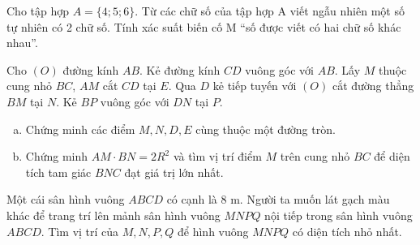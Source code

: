 \begin{ex} %
	Cho tập hợp $A=\{4;5;6\}$. Từ các chữ số của tập hợp A viết ngẫu nhiên một số tự nhiên có 2 chữ số. Tính xác suất biến cố M “số được viết có hai chữ số khác nhau”.
\end{ex}
\begin{ex} %
	Cho $(O)$ đường kính $AB$. Kẻ đường kính $CD$ vuông góc với $AB$. Lấy $M$ thuộc cung nhỏ $BC$, $AM$ cắt $CD$ tại $E$. Qua $D$ kẻ tiếp tuyến với $(O)$ cắt đường thẳng $BM$ tại $N$. Kẻ $BP$ vuông góc với $DN$ tại $P$.
	\begin{enumerate}[a)]
		\item Chứng minh các điểm $M, N, D, E$ cùng thuộc một đường tròn.
		\item Chứng minh $AM \cdot BN = 2R^2$ và tìm vị trí điểm $M$ trên cung nhỏ $BC$ để diện tích tam giác $BNC$ đạt giá trị lớn nhất.
	\end{enumerate}
	\loigiai{}
\end{ex}

\begin{ex} Một cái sân hình vuông $ABCD$ có cạnh là $8 \text{ m}$. Người ta muốn lát gạch màu khác để trang trí lên mảnh sân hình vuông $MNPQ$ nội tiếp trong sân hình vuông $ABCD$. Tìm vị trí của $M, N, P, Q$ để hình vuông $MNPQ$ có diện tích nhỏ nhất.

\end{ex}

